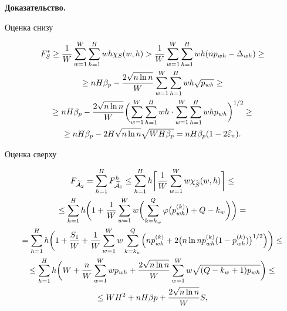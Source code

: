 {\bf Доказательство.}


Оценка снизу


\begin{gather*}


F_{S}^{\ast} \ge \frac {1}{W} \SWH


wh\chi_{S}(w,h) > \frac {1}{W} \SWH


wh(np_{wh}-\Delta_ {wh}) \ge \\


%


\ge nH\beta_{p} - \frac {2\sqrt {n \ln n}}{W}


\SWH wh\sqrt {p_{wh}} \ge \\


%


\ge nH\beta_{p} - \frac {2\sqrt {n \ln n}}{W}


\biggl(\SWH wh \cdot \SWH whp_{wh}\biggr)^{1/2} \ge \\


%


\ge nH\beta_{p} - 2H\sqrt {n \ln n} \sqrt {WH\beta_{p}}=


nH\beta_{p} (1-2\widehat {\eps}_{n}).


\end{gather*}


Оценка сверху


\begin{gather*}


F_{\widetilde {\cal A}_{2}} =


\SH F_{\widetilde {\cal A}_{1}}^{h} \le


\SH h \biggl\lceil \frac {1}{W} 


\SW w \chi_{\widetilde S}(w,h)


\biggr\rceil \le \\


%


\le \SH h\biggl(1 + \frac {1}{W} \SW w \biggl(\sum_{k=k_{w}}^{Q}


\varphi \bigl(p_{wh}^{(k)}\bigr)


+ Q - k_{w}\biggr)\biggr) = \\


%


= \SH h\biggl(1 + \frac {S_{1}}{W} +


\frac {1}{W} \SW w \sum_{k=k_{w}}^{Q}


\Bigl(n p_{wh}^{(k)} +


2\bigl(n\ln n p_{wh}^{(k)}(1-p_{wh}^{(k)})\bigr)^{1/2}


\Bigr)\biggr) \le \\


%


\le \SH h\biggl(W + \frac {n}{W} \SW w p_{wh} +


\frac {2 \sqrt {n\ln n}}{W} \SW


w \sqrt {(Q-k_{w}+1)p_{wh}}\biggr) \le \\


%


\le WH^{2} + nH\beta{p} + \frac {2 \sqrt {n\ln n}}{W} S,


\end{gather*}


